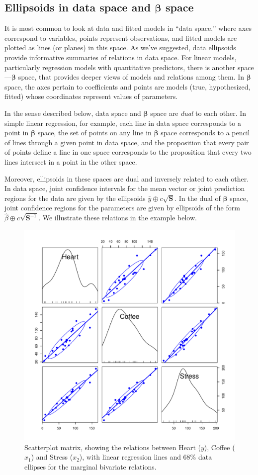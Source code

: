 \documentclass[11pt]{article}%
\renewcommand*{\vec}[1]{\ensuremath{\bm{#1}}}
\newcommand*{\mat}[1]{\ensuremath{\bm{#1}}}
\begin{document}





\subsection[Ellipsoids in data space and beta space]{Ellipsoids in data space and $\vec{\beta}$ space}
It is most common to look at data and fitted models in ``data space,'' where axes correspond to
variables, points represent observations, and fitted models are plotted as lines (or planes) in this space.
As we've suggested, data ellipsoids provide informative summaries of relations in data space.
For linear models, particularly regression models with quantitative predictors, there is another space---$\vec{\beta}$ space,
that provides deeper views of models and relations among them.
In $\vec{\beta}$ space, the axes pertain to coefficients and points are models (true, hypothesized, fitted) whose coordinates 
represent values of parameters.

In the sense described below, data space and $\vec{\beta}$ space are \emph{dual} to each other.
In simple linear regression, for example, each line in data space corresponds to a point in $\vec{\beta}$ space,
the set of points on any line in $\vec{\beta}$ space corresponds to a pencil of lines through a given point
in data space, and the proposition that every pair of points define a line in one space corresponds to
the proposition that every two lines intersect in a point in the other space.

Moreover, ellipsoids in these spaces are dual and inversely related to each other.
In data space, joint confidence intervals for the mean vector or joint prediction
regions for the data are given by the ellipsoids $\bar{y} \oplus c \sqrt{\mat{S}}$.
In the dual of $\vec{\beta}$ space, joint confidence regions for the parameters
are given by ellipsoids of the form $\hat{\beta} \oplus c \sqrt{\mat{S}^{-1}}$.
We illustrate these relations in the example below.

\begin{figure}[htb]
  \centering
  \includegraphics[width=.6\textwidth,clip]{fig/vis-reg-coffee11}
  \caption{Scatterplot matrix, showing the relations between Heart ($y$), Coffee ($x_1$) and Stress ($x_2$),
  with linear regression lines and 68\% data ellipses for the marginal bivariate relations.
  }%
  \label{fig:vis-reg-coffee11}
\end{figure}
\end{document}
